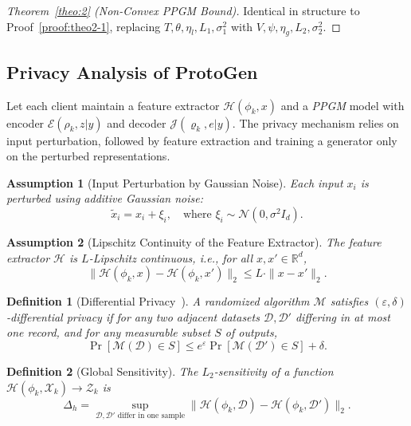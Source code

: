 \documentclass[lettersize,journal]{IEEEtran}
\newtheorem{assumption}{Assumption}
\newtheorem{proof}{Proof}
\newtheorem{definition}{Definition}
\begin{document}
\begin{proof}[Theorem~\ref{theo:2} (Non-Convex PPGM Bound)]
	Identical in structure to Proof~\ref{proof:theo2-1}, replacing $T,\theta,\eta_l,L_1,\sigma_1^2$ 
	with $V,\psi,\eta_g,L_2,\sigma_2^2$.
\end{proof}


\subsection{Privacy Analysis of \textsf{ProtoGen}}

Let each client maintain a feature extractor $\mathcal{H}(\phi_k,x)$ and a \emph{PPGM} model with encoder $\mathcal{E}(\rho_k,z|y)$ and decoder $\mathcal{J}(\varrho_k, e|y)$. The privacy mechanism relies on input perturbation, followed by feature extraction and training a generator only on the perturbed representations.

\begin{assumption}[Input Perturbation by Gaussian Noise]
\label{asm:6}
Each input $x_i$ is perturbed using additive Gaussian noise:
\[
\tilde{x}_i = x_i + \xi_i, \quad \text{where } \xi_i \sim \mathcal{N}(0, \sigma^2 I_d).
\]
\end{assumption}

\begin{assumption}[Lipschitz Continuity of the Feature Extractor]
\label{asm:7}
The feature extractor $\mathcal{H}$ is $L$-Lipschitz continuous, i.e., for all $x, x' \in \mathbb{R}^d$,
\[
\|\mathcal{H}(\phi_k,x) - \mathcal{H}(\phi_k,x')\|_2 \leq L \cdot \|x - x'\|_2.
\]
\end{assumption}

\begin{definition}[Differential Privacy~\cite{dwork2014algorithmic}]
A randomized algorithm $\mathcal{M}$ satisfies $(\varepsilon, \delta)$-differential privacy if for any two adjacent datasets $\mathcal{D}, \mathcal{D}'$ differing in at most one record, and for any measurable subset $S$ of outputs,
\[
\Pr[\mathcal{M}(\mathcal{D}) \in S] \leq e^\varepsilon \Pr[\mathcal{M}(\mathcal{D}') \in S] + \delta.
\]
\end{definition}

\begin{definition}[Global Sensitivity]
The $L_2$-sensitivity of a function $\mathcal{H}(\phi_k,\mathcal{X}_k) \rightarrow \mathcal{Z}_k$ is
\[
\Delta_h = \sup_{\mathcal{D}, \mathcal{D}' \text{ differ in one sample}} \|\mathcal{H}(\phi_k,\mathcal{D}) - \mathcal{H}(\phi_k,\mathcal{D}')\|_2.
\]
\end{definition}
\end{document}
